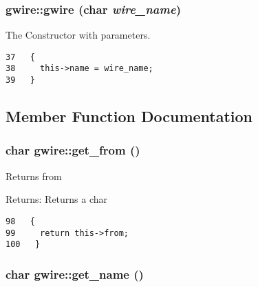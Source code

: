 \subsubsection{\setlength{\rightskip}{0pt plus 5cm}gwire::gwire (char {\em wire\_\-name})\hspace{0.3cm}{\tt  [inline]}}\label{classgwire_79a6885bd2bc7bd2b785d35e307da047}


The Constructor with parameters. 

\begin{Code}\begin{verbatim}37   {
38     this->name = wire_name;
39   }
\end{verbatim}\end{Code}




\subsection{Member Function Documentation}
\subsubsection{\setlength{\rightskip}{0pt plus 5cm}char gwire::get\_\-from ()\hspace{0.3cm}{\tt  [inline]}}\label{classgwire_5e0c4873abcb90c97933b8cde0b189bb}


Returns from

\begin{Desc}
\item[Returns:]Returns a char \end{Desc}


\begin{Code}\begin{verbatim}98   {
99     return this->from;
100   }
\end{verbatim}\end{Code}


\subsubsection{\setlength{\rightskip}{0pt plus 5cm}char gwire::get\_\-name ()\hspace{0.3cm}{\tt  [inline]}}\label{classgwire_cf26b05940c9e04eb9e21c2c2f003440}


